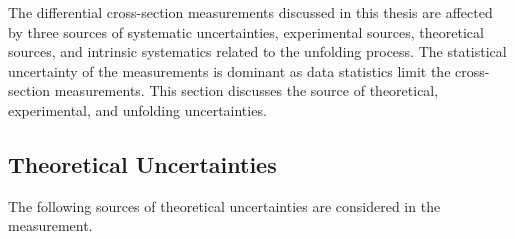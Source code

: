 The differential cross-section measurements discussed in this thesis are affected by three sources of systematic uncertainties, experimental sources, theoretical sources, and intrinsic systematics related to the unfolding process. The statistical uncertainty of the measurements is dominant as data statistics limit the cross-section measurements. This section discusses the source of theoretical, experimental, and unfolding uncertainties. 

\subsection{Theoretical Uncertainties}
\label{subsec:TheoryUnc}

The following sources of theoretical uncertainties are considered in the measurement.

